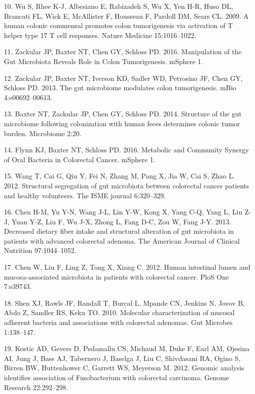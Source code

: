 \documentclass[12pt,]{article}
\begin{document}
\hypertarget{ref-wu_human_2009}{}
10. Wu S, Rhee K-J, Albesiano E, Rabizadeh S, Wu X, Yen H-R, Huso DL,
Brancati FL, Wick E, McAllister F, Housseau F, Pardoll DM, Sears CL.
2009. A human colonic commensal promotes colon tumorigenesis via
activation of T helper type 17 T cell responses. Nature Medicine
15:1016--1022.

\hypertarget{ref-zackular_manipulation_2016}{}
11. Zackular JP, Baxter NT, Chen GY, Schloss PD. 2016. Manipulation of
the Gut Microbiota Reveals Role in Colon Tumorigenesis. mSphere 1.

\hypertarget{ref-zackular_gut_2013}{}
12. Zackular JP, Baxter NT, Iverson KD, Sadler WD, Petrosino JF, Chen
GY, Schloss PD. 2013. The gut microbiome modulates colon tumorigenesis.
mBio 4:e00692--00613.

\hypertarget{ref-baxter_structure_2014}{}
13. Baxter NT, Zackular JP, Chen GY, Schloss PD. 2014. Structure of the
gut microbiome following colonization with human feces determines
colonic tumor burden. Microbiome 2:20.

\hypertarget{ref-flynn_metabolic_2016}{}
14. Flynn KJ, Baxter NT, Schloss PD. 2016. Metabolic and Community
Synergy of Oral Bacteria in Colorectal Cancer. mSphere 1.

\hypertarget{ref-wang_structural_2012}{}
15. Wang T, Cai G, Qiu Y, Fei N, Zhang M, Pang X, Jia W, Cai S, Zhao L.
2012. Structural segregation of gut microbiota between colorectal cancer
patients and healthy volunteers. The ISME journal 6:320--329.

\hypertarget{ref-chen_decreased_2013}{}
16. Chen H-M, Yu Y-N, Wang J-L, Lin Y-W, Kong X, Yang C-Q, Yang L, Liu
Z-J, Yuan Y-Z, Liu F, Wu J-X, Zhong L, Fang D-C, Zou W, Fang J-Y. 2013.
Decreased dietary fiber intake and structural alteration of gut
microbiota in patients with advanced colorectal adenoma. The American
Journal of Clinical Nutrition 97:1044--1052.

\hypertarget{ref-chen_human_2012}{}
17. Chen W, Liu F, Ling Z, Tong X, Xiang C. 2012. Human intestinal lumen
and mucosa-associated microbiota in patients with colorectal cancer.
PloS One 7:e39743.

\hypertarget{ref-shen_molecular_2010}{}
18. Shen XJ, Rawls JF, Randall T, Burcal L, Mpande CN, Jenkins N, Jovov
B, Abdo Z, Sandler RS, Keku TO. 2010. Molecular characterization of
mucosal adherent bacteria and associations with colorectal adenomas. Gut
Microbes 1:138--147.

\hypertarget{ref-kostic_genomic_2012}{}
19. Kostic AD, Gevers D, Pedamallu CS, Michaud M, Duke F, Earl AM,
Ojesina AI, Jung J, Bass AJ, Tabernero J, Baselga J, Liu C, Shivdasani
RA, Ogino S, Birren BW, Huttenhower C, Garrett WS, Meyerson M. 2012.
Genomic analysis identifies association of Fusobacterium with colorectal
carcinoma. Genome Research 22:292--298.
\end{document}

